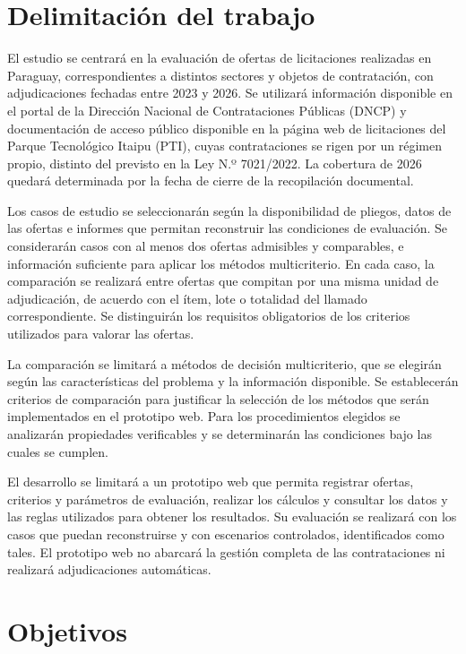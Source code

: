 \documentclass[12pt,a4paper]{article}
\begin{document}
\section{Delimitación del trabajo}

El estudio se centrará en la evaluación de ofertas de licitaciones realizadas en Paraguay, correspondientes a distintos sectores y objetos de contratación, con adjudicaciones fechadas entre 2023 y 2026. Se utilizará información disponible en el portal de la Dirección Nacional de Contrataciones Públicas (DNCP) y documentación de acceso público disponible en la página web de licitaciones del Parque Tecnológico Itaipu (PTI), cuyas contrataciones se rigen por un régimen propio, distinto del previsto en la Ley N.º 7021/2022. La cobertura de 2026 quedará determinada por la fecha de cierre de la recopilación documental.

Los casos de estudio se seleccionarán según la disponibilidad de pliegos, datos de las ofertas e informes que permitan reconstruir las condiciones de evaluación. Se considerarán casos con al menos dos ofertas admisibles y comparables, e información suficiente para aplicar los métodos multicriterio. En cada caso, la comparación se realizará entre ofertas que compitan por una misma unidad de adjudicación, de acuerdo con el ítem, lote o totalidad del llamado correspondiente. Se distinguirán los requisitos obligatorios de los criterios utilizados para valorar las ofertas.

La comparación se limitará a métodos de decisión multicriterio, que se elegirán según las características del problema y la información disponible. Se establecerán criterios de comparación para justificar la selección de los métodos que serán implementados en el prototipo web. Para los procedimientos elegidos se analizarán propiedades verificables y se determinarán las condiciones bajo las cuales se cumplen.

El desarrollo se limitará a un prototipo web que permita registrar ofertas, criterios y parámetros de evaluación, realizar los cálculos y consultar los datos y las reglas utilizados para obtener los resultados. Su evaluación se realizará con los casos que puedan reconstruirse y con escenarios controlados, identificados como tales. El prototipo web no abarcará la gestión completa de las contrataciones ni realizará adjudicaciones automáticas.



\section{Objetivos}
\end{document}
